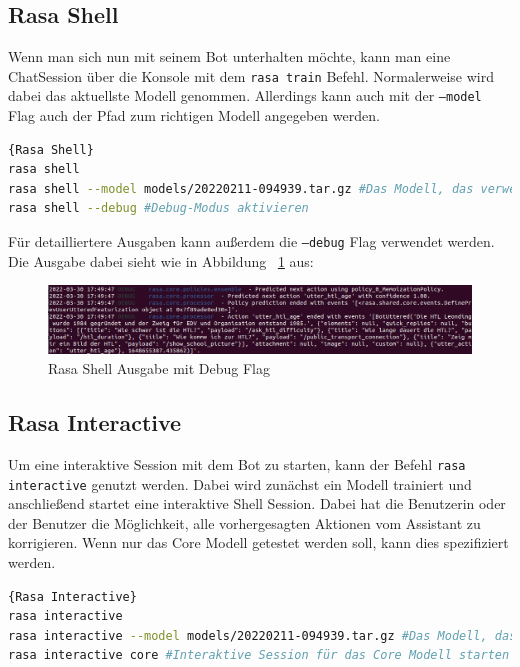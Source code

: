 \subsection{Rasa Shell}\label{subsec:rasa-shell}

Wenn man sich nun mit seinem Bot unterhalten möchte, kann man eine ChatSession über die Konsole mit dem \texttt{rasa train} Befehl.
Normalerweise wird dabei das aktuellste Modell genommen.
Allerdings kann auch mit der \texttt{--model} Flag auch der Pfad zum richtigen Modell angegeben werden.

\begin{lstlisting}[language=bash,label={lst:shell-command},caption={Rasa Shell Befehle}]{Rasa Shell}
rasa shell
rasa shell --model models/20220211-094939.tar.gz #Das Modell, das verwendet werden soll
rasa shell --debug #Debug-Modus aktivieren
\end{lstlisting}

Für detailliertere Ausgaben kann außerdem die \texttt{--debug} Flag verwendet werden.
Die Ausgabe dabei sieht wie in Abbildung ~\ref{fig:rasa_shell} aus:

\begin{figure}[hbt!]
    \centering
    \includegraphics[scale=0.4]{pics/rasa_shell}
    \caption{Rasa Shell Ausgabe mit Debug Flag}
    \label{fig:rasa_shell}
\end{figure}

\subsection{Rasa Interactive}\label{subsec:rasa-interactive}

Um eine interaktive Session mit dem Bot zu starten, kann der Befehl \texttt{rasa interactive} genutzt werden.
Dabei wird zunächst ein Modell trainiert und anschließend startet eine interaktive Shell Session.
Dabei hat die Benutzerin oder der Benutzer die Möglichkeit, alle vorhergesagten Aktionen vom Assistant zu korrigieren.
Wenn nur das Core Modell getestet werden soll, kann dies spezifiziert werden.

\begin{lstlisting}[language=bash,label={lst:interactive-command},caption={Interaktive Trainingssession starten}]{Rasa Interactive}
rasa interactive
rasa interactive --model models/20220211-094939.tar.gz #Das Modell, das verwendet werden soll
rasa interactive core #Interaktive Session für das Core Modell starten
\end{lstlisting}

